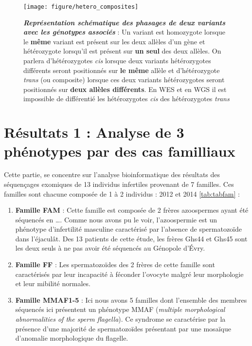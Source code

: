 \documentclass[12pt,twoside]{ugathesis}
\providecommand{\tightlist}{%
  \setlength{\itemsep}{0pt}\setlength{\parskip}{0pt}}
\begin{document}
\begin{figure}

{\centering \texttt{[image: figure/hetero\_composites]} 

}

\caption[Représentation schématique des phasages de deux variants avec les génotypes associés]{\textbf{\emph{Représentation schématique des
phasages de deux variants avec les génotypes associés}} : Un variant est
homozygote lorsque le \textbf{même} variant est présent sur les deux
allèles d'un gène et hétérozygote lorsqu'il est présent sur \textbf{un
seul} des deux allèles. On parlera d'hétérozygotes \emph{cis} lorsque
deux variants hétérozygotes différents seront positionnés sur \textbf{le
même} allèle et d'hétérozygote \emph{trans} (ou composite) lorsque ces
deux variants hétérozygotes seront positionnés sur \textbf{deux allèles
différents}. En WES et en WGS il est impossible de différentié les
hétérozygotes \emph{cis} des hétérozygotes \emph{trans}}\label{fig:piccompositehet}
\end{figure}












\newpage

\section{Résultats 1 : Analyse de 3 phénotypes par des cas
familliaux}\label{resultats-1-analyse-de-3-phenotypes-par-des-cas-familliaux}

Cette partie, se concentre sur l'analyse bioinformatique des résultats
des séquençages exomiques de 13 individus infertiles provenant de 7
familles. Ces familles sont chacune composée de 1 à 2 individus : 2012
et 2014 \ref{tab:tabfam} :

\begin{enumerate}
\def\labelenumi{\arabic{enumi}.}
\tightlist
\item
  \textbf{Famille FAM} : Cette famille est composée de 2 frères
  azoospermes ayant été séquencés en \ldots{}. Comme nous avons pu le
  voir, l'azoospermie est un phénotype d'infertilité masculine
  caractérisé par l'absence de spermatozoïde dans l'éjaculât. Des 13
  patients de cette étude, les frères Ghs44 et Ghs45 sont les deux seuls
  à ne pas avoir été séquencés au Génopole d'Évry.\\
\item
  \textbf{Famille FF} : Les spermatozoïdes des 2 frères de cette famille
  sont caractérisés par leur incapacité à féconder l'ovocyte malgré leur
  morphologie et leur mibilité normales.\\
\item
  \textbf{Famille MMAF1-5} : Ici nous avons 5 familles dont l'ensemble
  des membres séquencés ici présentent un phénotype MMAF (\emph{multiple
  morphological abnormalities of the sperm flagella}). Ce syndrome se
  caractérise par la présence d'une majorité de spermatozoïdes
  présentant par une mosaïque d'anomalie morphologique du flagelle.
\end{enumerate}
\end{document}
